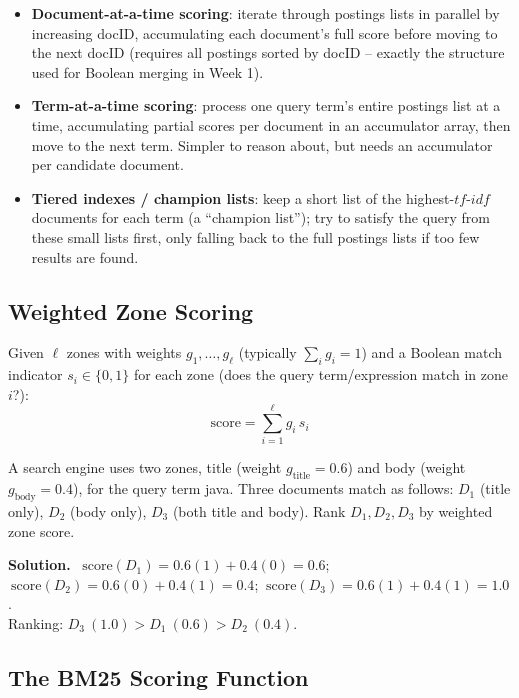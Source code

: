 \documentclass[11pt, a4paper]{article}
\newcommand{\Solution}{\medskip\noindent\textbf{\color{exgreen}Solution.}\ }
\begin{document}
\begin{itemize}
  \item \textbf{Document-at-a-time scoring}: iterate through postings lists in parallel by increasing docID, accumulating each document's full score before moving to the next docID (requires all postings sorted by docID -- exactly the structure used for Boolean merging in Week 1).
  \item \textbf{Term-at-a-time scoring}: process one query term's entire postings list at a time, accumulating partial scores per document in an accumulator array, then move to the next term. Simpler to reason about, but needs an accumulator per candidate document.
  \item \textbf{Tiered indexes / champion lists}: keep a short list of the highest-$tf\text{-}idf$ documents for each term (a ``champion list''); try to satisfy the query from these small lists first, only falling back to the full postings lists if too few results are found.
\end{itemize}

\subsection{Weighted Zone Scoring}

\begin{formulabox}
Given $\ell$ zones with weights $g_1,\dots,g_\ell$ (typically $\sum_i g_i = 1$) and a Boolean match indicator $s_i \in \{0,1\}$ for each zone (does the query term/expression match in zone $i$?):
\[
\text{score} = \sum_{i=1}^{\ell} g_i\, s_i
\]
\end{formulabox}

\begin{exercisebox}
A search engine uses two zones, title (weight $g_{\text{title}}=0.6$) and body (weight $g_{\text{body}}=0.4$), for the query term \textsf{java}. Three documents match as follows: $D_1$ (title only), $D_2$ (body only), $D_3$ (both title and body). Rank $D_1,D_2,D_3$ by weighted zone score.
\end{exercisebox}

\Solution
$\text{score}(D_1) = 0.6(1)+0.4(0) = 0.6$; $\ \text{score}(D_2)=0.6(0)+0.4(1)=0.4$; $\ \text{score}(D_3)=0.6(1)+0.4(1)=1.0$.\\
Ranking: $D_3\ (1.0) > D_1\ (0.6) > D_2\ (0.4)$.

\subsection{The BM25 Scoring Function}
\end{document}
